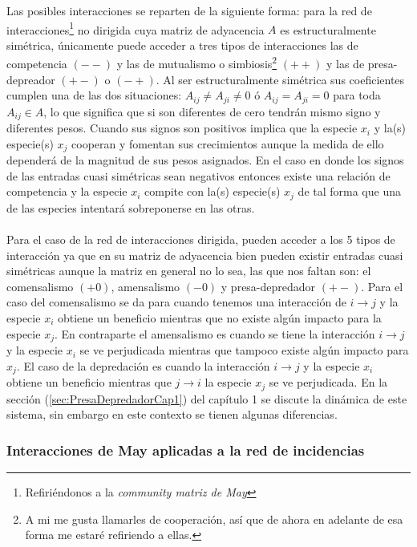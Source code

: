 Las posibles interacciones se reparten de la siguiente forma: para la red de interacciones\footnote{Refiriéndonos a la \textit{community matriz de May}} no dirigida cuya matriz de adyacencia $A$ es estructuralmente simétrica, únicamente puede acceder a tres tipos de interacciones las de competencia $(--)$ y las de mutualismo o simbiosis\footnote{A mi me gusta llamarles de cooperación, así que de ahora en adelante de esa forma me estaré refiriendo a ellas.} $(++)$ y las de presa-depreador $(+-)$ o $(-+)$. Al ser estructuralmente simétrica sus coeficientes cumplen una de las dos situaciones: $A_{ij}\neq A_{ji}\neq 0$ ó $A_{ij}=A_{ji}=0$ para toda $A_{ij}\in A$, lo que significa que si son diferentes de cero tendrán mismo signo y diferentes pesos. Cuando sus signos son positivos implica que la especie $x_i$ y la(s) especie(s) $x_j$ cooperan y fomentan sus crecimientos aunque la medida de ello dependerá de la magnitud de sus pesos asignados. En el caso en donde los signos de las entradas cuasi simétricas sean negativos entonces existe una relación de competencia y la especie $x_i$ compite con la(s) especie(s) $x_j$ de tal forma que una de las especies intentará sobreponerse en las otras. 
\\
\\
Para el caso de la red de interacciones dirigida, pueden acceder a los 5 tipos de interacción ya que en su matriz de adyacencia bien pueden existir entradas cuasi simétricas aunque la matriz en general no lo sea, las que nos faltan son: el comensalismo $(+0)$, amensalismo $(-0)$ y presa-depredador $(+-)$. Para el caso del comensalismo se da para cuando tenemos una interacción de $i\to j$ y la especie $x_i$ obtiene un beneficio mientras que no existe algún impacto para la especie $x_j$. En contraparte el amensalismo es cuando se tiene la interacción $i\to j$ y la especie $x_i$ se ve perjudicada mientras que tampoco existe algún impacto para $x_j$. El caso de la depredación es cuando la interacción $i\to j$ y la especie $x_i$ obtiene un beneficio mientras que $j\to i$ la especie $x_j$ se ve perjudicada. En la sección (\ref{sec:PresaDepredadorCap1}) del capítulo 1 se discute la dinámica de este sistema, sin embargo en este contexto se tienen algunas diferencias. 

\subsubsection*{Interacciones de May aplicadas a la red de incidencias}

